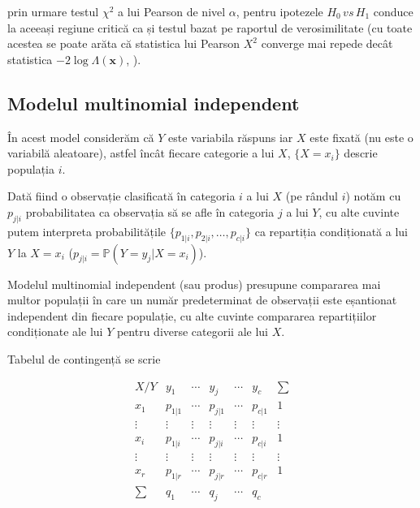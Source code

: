 \documentclass[]{article}
\begin{document}
prin urmare testul \(\chi^2\) a lui Pearson de nivel \(\alpha\), pentru
ipotezele \(H_0\,vs\,H_1\) conduce la aceeași regiune critică ca și
testul bazat pe raportul de verosimilitate (cu toate acestea se poate
arăta că statistica lui Pearson \(X^2\) converge mai repede decât
statistica \(-2\log \Lambda(\mathbf{x})\), \citep{Agresti2012}).

\subsection{Modelul multinomial
independent}\label{modelul-multinomial-independent}

În acest model considerăm că \(Y\) este variabila răspuns iar \(X\) este
fixată (nu este o variabilă aleatoare), astfel încât fiecare categorie a
lui \(X\), \(\{X = x_i\}\) descrie populația \(i\).

Dată fiind o observație clasificată în categoria \(i\) a lui \(X\) (pe
rândul \(i\)) notăm cu \(p_{j|i}\) probabilitatea ca observația să se
afle în categoria \(j\) a lui \(Y\), cu alte cuvinte putem interpreta
probabilitățile \(\{p_{1|i}, p_{2|i}, \ldots, p_{c|i}\}\) ca repartiția
condiționată a lui \(Y\) la \(X = x_i\)
(\(p_{j|i} = \mathbb{P}(Y = y_j|X = x_i)\)).

Modelul multinomial independent (sau produs) presupune compararea mai
multor populații în care un număr predeterminat de observații este
eșantionat independent din fiecare populație, cu alte cuvinte compararea
repartițiilor condiționate ale lui \(Y\) pentru diverse categorii ale
lui \(X\).

Tabelul de contingență se scrie

\[
\begin{array}{c|ccccc|c}
  X / Y  &  y_1      & \cdots &  y_j     & \cdots &  y_c     & \sum\\
  \hline
  x_1      &  p_{1|1} & \cdots & p_{j|1} & \cdots & p_{c|1} & 1\\
  \vdots & \vdots  & \vdots & \vdots & \vdots & \vdots & \vdots  \\
  x_i      &  p_{1|i} & \cdots & p_{j|i} & \cdots & p_{c|i} & 1\\
  \vdots & \vdots  & \vdots & \vdots & \vdots & \vdots & \vdots  \\
  x_r      &  p_{1|r} & \cdots & p_{j|r} & \cdots & p_{c|r} & 1\\
  \hline
  \sum&  q_{1} & \cdots & q_{j} & \cdots & q_{c} & \\
\end{array}
\]
\end{document}
